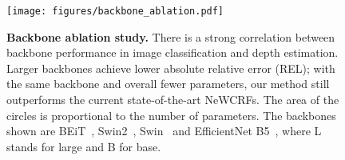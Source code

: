 \documentclass[10pt,twocolumn,letterpaper]{article}
\begin{document}
\begin{figure}[!htb]
    \centering
    \texttt{[image: figures/backbone\_ablation.pdf]}
    \vspace{-12pt}
    \caption{\textbf{Backbone ablation study.} There is a strong correlation between backbone performance in image classification and depth estimation. Larger backbones achieve lower absolute relative error (REL); with the same backbone and overall fewer parameters, our method still outperforms the current state-of-the-art NeWCRFs. The area of the circles is proportional to the number of parameters. The backbones shown are BEiT~\cite{DBLP:journals/corr/abs-2106-08254}, Swin2~\cite{liu2022swin}, Swin~\cite{liu2021swin} and EfficientNet B5~\cite{efficentnet_TanL19}, where L stands for large and B for base.}
    \label{fig:ablation-backbone}
    \vspace{-12pt}
\end{figure}
\end{document}
